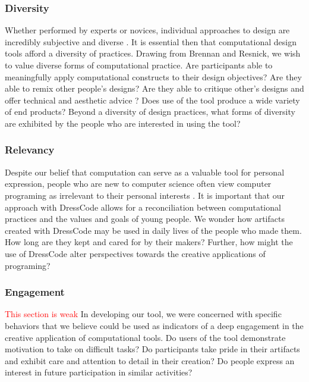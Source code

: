 \documentclass{sigchi}
\begin{document}
\subsubsection{Diversity}
 Whether performed by experts or novices, individual approaches to design are incredibly subjective and diverse \cite{learning_in_design}. It is essential then that computational design tools afford a diversity of practices. Drawing from Brennan and Resnick, we wish to value diverse forms of computational practice. Are participants able to meaningfully apply computational constructs to their design objectives? Are they able to remix other people's designs? Are they able to critique other's designs and offer technical and aesthetic advice \cite{computational_thinking}? Does use of the tool produce a wide variety of end products? Beyond a diversity of design practices, what forms of diversity are exhibited by the people who are interested in using the tool? %

\subsubsection{Relevancy}
 Despite our belief that computation can serve as a valuable tool for personal expression, people who are new to computer science often view computer programing as irrelevant to their personal interests \cite{introductory_programming}. It is important that our approach with DressCode allows for a reconciliation between computational practices and the values and goals of young people. We wonder how artifacts created with DressCode may be used in daily lives of the people who made them. How long are they kept and cared for by their makers? Further, how might the use of DressCode alter perspectives towards the creative applications of programing?

\subsubsection{Engagement}
\textcolor{red}{This section is weak} %
In developing our tool, we were concerned with specific behaviors that we believe could be used as indicators of a deep engagement in the creative application of computational tools. Do users of the tool demonstrate motivation to take on difficult tasks? Do participants take pride in their artifacts and exhibit care and attention to detail in their creation? Do people express an interest in future participation in similar activities? 
\end{document}

